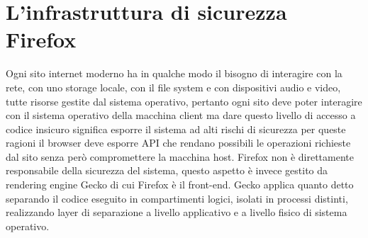 \documentclass[]{./sapthesis/sapthesis}
\begin{document}
\chapter{L'infrastruttura di sicurezza Firefox}
    Ogni sito internet moderno ha in qualche modo il bisogno di interagire con la rete,
    con uno storage locale, con il file system e con dispositivi audio e video, tutte
    risorse gestite dal sistema operativo, pertanto ogni sito deve poter interagire con
    il sistema operativo della macchina client ma dare questo livello di accesso a codice
    insicuro significa esporre il sistema ad alti rischi di sicurezza per queste ragioni
    il browser deve esporre API che rendano possibili le operazioni richieste dal sito
    senza però compromettere la macchina host.
    Firefox non è direttamente responsabile della sicurezza del sistema, questo aspetto è
    invece gestito da rendering engine Gecko di cui Firefox è il front-end.
    Gecko applica quanto detto separando il codice eseguito in compartimenti
    logici, isolati in processi distinti, realizzando layer di separazione a livello
    applicativo e a livello fisico di sistema operativo.
\end{document}
